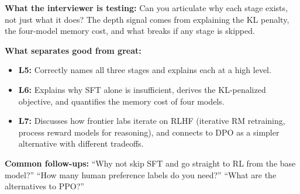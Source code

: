 \begin{interviewq}
\textbf{What the interviewer is testing:} Can you articulate why each stage exists, not just what it does? The depth signal comes from explaining the KL penalty, the four-model memory cost, and what breaks if any stage is skipped.

\textbf{What separates good from great:}
\begin{itemize}
    \item \textbf{L5:} Correctly names all three stages and explains each at a high level.
    \item \textbf{L6:} Explains why SFT alone is insufficient, derives the KL-penalized objective, and quantifies the memory cost of four models.
    \item \textbf{L7:} Discusses how frontier labs iterate on RLHF (iterative RM retraining, process reward models for reasoning), and connects to DPO as a simpler alternative with different tradeoffs.
\end{itemize}

\textbf{Common follow-ups:} ``Why not skip SFT and go straight to RL from the base model?'' ``How many human preference labels do you need?'' ``What are the alternatives to PPO?''
\end{interviewq}


